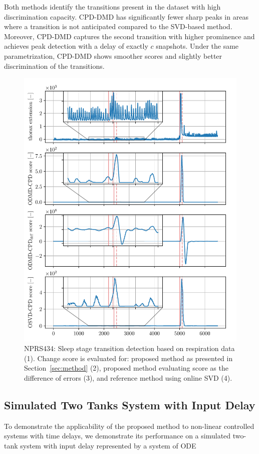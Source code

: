 Both methods identify the transitions present in the dataset with high discrimination capacity. CPD-DMD has significantly fewer sharp peaks in areas where a transition is not anticipated compared to the SVD-based method. Moreover, CPD-DMD captures the second transition with higher prominence and achieves peak detection with a delay of exactly \(c\) snapshots. Under the same parametrization, CPD-DMD shows smoother scores and slightly better discrimination of the transitions.

\begin{figure}[H]
	\centering
	\includegraphics[width=\linewidth]{figures/nprs44-chd_r2-roll_301-dmd_w1.0-h80.pdf}
	\caption{NPRS434: Sleep stage transition detection based on respiration data (1). Change score is evaluated for: proposed method as presented in Section~\ref{sec:method} (2), proposed method evaluating score as the difference of errors (3), and reference method using online SVD (4).}\label{fig:nprs44}
\end{figure}

\subsection{Simulated Two Tanks System with Input Delay}
To demonstrate the applicability of the proposed method to non-linear controlled systems with time delays, we demonstrate its performance on a simulated two-tank system with input delay represented by a system of ODE

